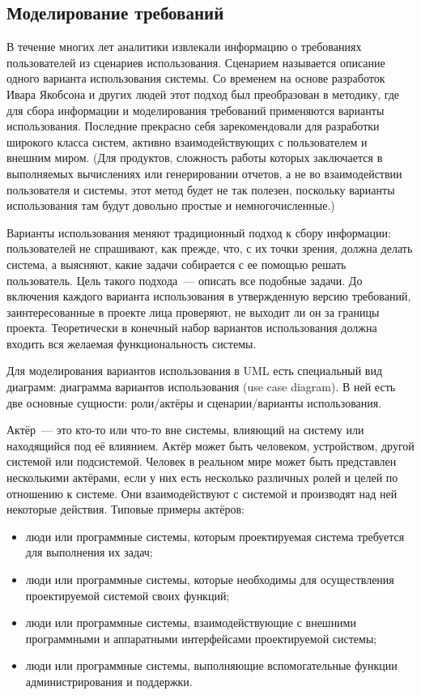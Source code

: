 \documentclass{../../text-style}
\begin{document}
\subsection{Моделирование требований}

В течение многих лет аналитики извлекали информацию о требованиях пользователей из сценариев использования.
Сценарием называется описание одного варианта использования системы.
Со временем на основе разработок Ивара Якобсона и других людей этот подход был преобразован в методику, где для сбора информации и моделирования требований применяются варианты использования.
Последние прекрасно себя зарекомендовали для разработки широкого класса систем, активно взаимодействующих с пользователем и внешним миром.
(Для продуктов, сложность работы которых заключается в выполняемых вычислениях или генерировании отчетов, а не во взаимодействии пользователя и системы, этот метод будет не так полезен, поскольку варианты использования там будут довольно простые и немногочисленные.)

Варианты использования меняют традиционный подход к сбору информации: пользователей не спрашивают, как прежде, что, с их точки зрения, должна делать система, а выясняют, какие задачи собирается с ее помощью решать пользователь.
Цель такого подхода~--- описать все подобные задачи.
До включения каждого варианта использования в утвержденную версию требований, заинтересованные в проекте лица проверяют, не выходит ли он за границы проекта.
Теоретически в конечный набор вариантов использования должна входить вся желаемая функциональность системы.

Для моделирования вариантов использования в UML есть специальный вид диаграмм: диаграмма вариантов использования (use case diagram).
В ней есть две основные сущности: роли/актёры и сценарии/варианты использования.

Актёр~--- это кто-то или что-то вне системы, влияющий на систему или находящийся под её влиянием.
Актёр может быть человеком, устройством, другой системой или подсистемой.
Человек в реальном мире может быть представлен несколькими актёрами, если у них есть несколько различных ролей и целей по отношению к системе.
Они взаимодействуют с системой и производят над ней некоторые действия.
Типовые примеры актёров:

\begin{itemize}
    \item люди или программные системы, которым проектируемая система требуется для выполнения их задач;
    \item люди или программные системы, которые необходимы для осуществления проектируемой системой своих функций;
    \item люди или программные системы, взаимодействующие с внешними программными и аппаратными интерфейсами проектируемой системы;
    \item люди или программные системы, выполняющие вспомогательные функции администрирования и поддержки.
\end{itemize}
\end{document}
